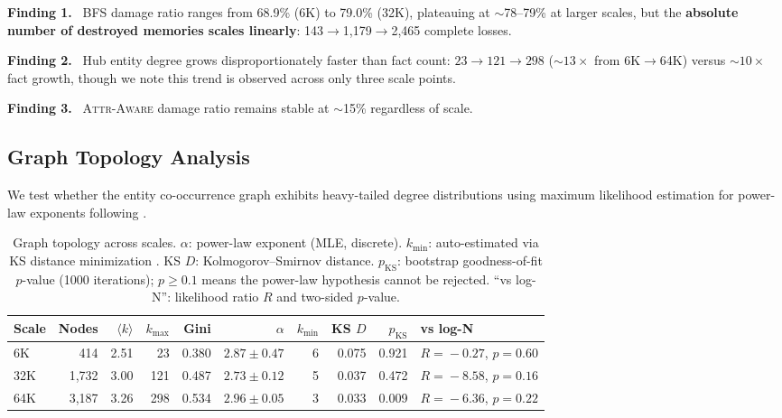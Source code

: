 \documentclass[11pt]{article}
\newcommand{\attraware}{\textsc{Attr-Aware}}
\newcommand{\finding}[1]{\vspace{2pt}\noindent\textbf{Finding #1.}~}
\begin{document}
\finding{1} BFS damage ratio ranges from 68.9\% (6K) to 79.0\% (32K), plateauing at $\sim$78--79\% at larger scales, but the \textbf{absolute number of destroyed memories scales linearly}: 143$\rightarrow$1,179$\rightarrow$2,465 complete losses.

\finding{2} Hub entity degree grows disproportionately faster than fact count: $23 \rightarrow 121 \rightarrow 298$ (${\sim}13\times$ from 6K$\rightarrow$64K) versus ${\sim}10\times$ fact growth, though we note this trend is observed across only three scale points.

\finding{3} \attraware{} damage ratio remains stable at $\sim$15\% regardless of scale.

\subsection{Graph Topology Analysis}

We test whether the entity co-occurrence graph exhibits heavy-tailed degree distributions using maximum likelihood estimation for power-law exponents following \citet{clauset_powerlaw_2009}.

\begin{table}[htbp]
\centering
\small
\begin{tabular}{lrrrrrrrrl}
\toprule
\textbf{Scale} & \textbf{Nodes} & \textbf{$\langle k \rangle$} & \textbf{$k_{\max}$} & \textbf{Gini} & \textbf{$\alpha$} & \textbf{$k_{\min}$} & \textbf{KS $D$} & \textbf{$p_{\text{KS}}$} & \textbf{vs log-N} \\
\midrule
6K  & 414   & 2.51 & 23  & 0.380 & $2.87 \pm 0.47$ & 6 & 0.075 & 0.921 & $R\!=\!-0.27$, $p\!=\!0.60$ \\
32K & 1,732 & 3.00 & 121 & 0.487 & $2.73 \pm 0.12$ & 5 & 0.037 & 0.472 & $R\!=\!-8.58$, $p\!=\!0.16$ \\
64K & 3,187 & 3.26 & 298 & 0.534 & $2.96 \pm 0.05$ & 3 & 0.033 & 0.009 & $R\!=\!-6.36$, $p\!=\!0.22$ \\
\bottomrule
\end{tabular}
\caption{Graph topology across scales. $\alpha$: power-law exponent (MLE, discrete). $k_{\min}$: auto-estimated via KS distance minimization \citep{clauset_powerlaw_2009}. KS $D$: Kolmogorov--Smirnov distance. $p_{\text{KS}}$: bootstrap goodness-of-fit $p$-value (1000 iterations); $p \geq 0.1$ means the power-law hypothesis cannot be rejected. ``vs log-N'': likelihood ratio $R$ and two-sided $p$-value.}
\label{tab:topology}
\end{table}
\end{document}
